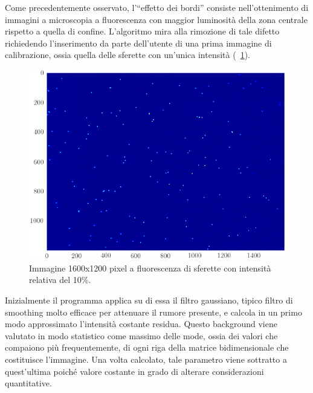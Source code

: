 Come precedentemente osservato, l'``effetto dei bordi'' consiste nell'ottenimento di immagini a microscopia a fluorescenza con maggior luminosità della zona centrale rispetto a quella di confine. 
L'algoritmo mira alla rimozione di tale difetto richiedendo l'inserimento da parte dell'utente di una prima immagine di calibrazione, ossia quella delle sferette con un'unica intensità (\figurename~\ref{fig:unaint}).

\begin{figure}
 \centering
 \includegraphics[scale=1]{img/CAP3unaint.png}
 \caption{\small{Immagine 1600x1200 pixel a fluorescenza di sferette con intensità relativa del 10\%.}}
 \label{fig:unaint}
\end{figure}

Inizialmente il programma applica su di essa il filtro gaussiano, tipico filtro di smoothing molto efficace per attenuare il rumore presente, e calcola in un primo modo approssimato l'intensità costante residua.
Questo background viene valutato in modo statistico come massimo delle mode, ossia dei valori che compaiono più frequentemente, di ogni riga della matrice bidimensionale che costituisce l'immagine. 
Una volta calcolato, tale parametro viene sottratto a quest'ultima poiché valore costante in grado di alterare considerazioni quantitative.


